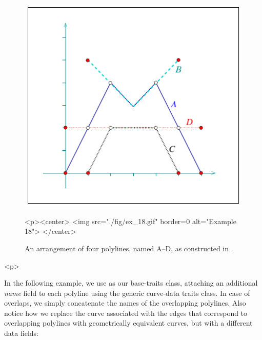 
\begin{figure}[!htp]
\begin{ccTexOnly}
  \begin{center}
  \includegraphics{Arrangement_2/fig/ex_18}
  \end{center}
\end{ccTexOnly}
\begin{ccHtmlOnly}
  <p><center>
  <img src="./fig/ex_18.gif" border=0 alt="Example 18">
  </center>
\end{ccHtmlOnly}
\caption{An arrangement of four polylines, named A--D, as
constructed in .}
\label{arr_fig:ex_18}
\end{figure}

\begin{ccHtmlOnly}<p>\end{ccHtmlOnly}
In the following example, we use  as
our base-traits class, attaching an additional {\em name} field to
each polyline using the generic curve-data traits class. In case of
overlaps, we simply concatenate the names of the overlapping
polylines. Also notice how we replace the curve associated with
the edges that correspond to overlapping polylines with 
geometrically equivalent curves, but with a different data fields:


